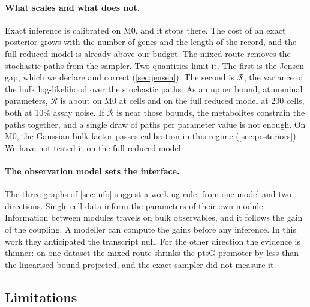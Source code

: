 \paragraph{What scales and what does not.} Exact inference is calibrated on M0, and it stops there. The cost of an exact posterior grows with
the number of genes and the length of the record, and the full reduced model is
already above our budget. The mixed route removes the stochastic paths from
the sampler. Two quantities limit it. The first is the Jensen gap, which we declare
and correct (\cref{sec:jensen}). The second is $\mathcal{R}$, the variance of the bulk log-likelihood over the stochastic paths. As an upper bound, at nominal parameters, $\mathcal{R}$ is about  on M0 at  cells and  on the full reduced model at 200 cells, both at 10\% assay noise. If $\mathcal{R}$ is near those bounds, the metabolites constrain the paths together, and a single draw of paths per parameter value is not enough. On M0, the Gaussian bulk factor passes calibration
in this regime (\cref{sec:posteriors}). We have not tested it on the full reduced model.

\paragraph{The observation model sets the interface.} The three graphs of
\cref{sec:info} suggest a working rule, from one model and two directions. Single-cell data inform the parameters of their
own module. Information between modules travels on bulk observables, and it follows
the gain of the coupling. A modeller can compute the gains before any inference. In this work they anticipated the transcript null. For the other direction the evidence is thinner: on one dataset the mixed route shrinks the ptsG promoter by less than the linearised bound projected, and the exact sampler did not measure it.

\subsection{Limitations}

